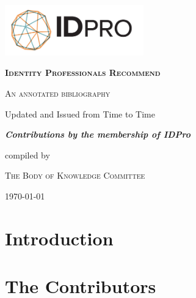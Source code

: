 \documentclass[11pt, oneside,american]{article}
\begin{document}
\begin{titlepage}
	\centering
	\includegraphics[width=0.45\textwidth]{media/idpro-logo.png}\par\vspace{1cm}
	{\scshape\huge\bfseries  Identity Professionals Recommend \par}
	\vspace{1cm}
	{\scshape\LARGE An annotated bibliography\par}
	\vspace{1.5cm}
	{\large Updated and Issued from Time to Time\par}
	\vspace{2cm}
	{\Large\itshape\bfseries Contributions by the membership of IDPro\par}
	\vfill
	compiled by\par
	\textsc{The Body of Knowledge Committee}
	\vfill
	{\large \today\par}
\end{titlepage}
\section{Introduction}

\section{The Contributors}


\printbibliography 
\end{document}
